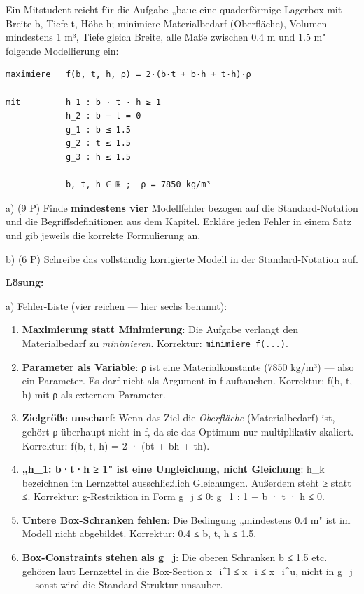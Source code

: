 \documentclass[11pt, a4paper]{article}
\begin{document}
Ein Mitstudent reicht für die Aufgabe „baue eine quaderförmige Lagerbox mit Breite b, Tiefe t, Höhe h; minimiere Materialbedarf (Oberfläche), Volumen mindestens 1 m³, Tiefe gleich Breite, alle Maße zwischen 0.4 m und 1.5 m" folgende Modellierung ein:


\begin{lstlisting}
maximiere   f(b, t, h, ρ) = 2·(b·t + b·h + t·h)·ρ

mit         h_1 : b · t · h ≥ 1
            h_2 : b − t = 0
            g_1 : b ≤ 1.5
            g_2 : t ≤ 1.5
            g_3 : h ≤ 1.5

            b, t, h ∈ ℝ ;  ρ = 7850 kg/m³
\end{lstlisting}


a) (9 P) Finde \textbf{mindestens vier} Modellfehler bezogen auf die Standard-Notation und die Begriffsdefinitionen aus dem Kapitel. Erkläre jeden Fehler in einem Satz und gib jeweils die korrekte Formulierung an.


b) (6 P) Schreibe das vollständig korrigierte Modell in der Standard-Notation auf.


\textbf{Lösung:}


a) Fehler-Liste (vier reichen — hier sechs benannt):


\begin{enumerate}
  \item \textbf{Maximierung statt Minimierung}: Die Aufgabe verlangt den Materialbedarf zu \textit{minimieren}. Korrektur: \texttt{minimiere f(...)}.
  \item \textbf{Parameter als Variable}: ρ ist eine Materialkonstante (7850 kg/m³) — also ein Parameter. Es darf nicht als Argument in f auftauchen. Korrektur: f(b, t, h) mit ρ als externem Parameter.
  \item \textbf{Zielgröße unscharf}: Wenn das Ziel die \textit{Oberfläche} (Materialbedarf) ist, gehört ρ überhaupt nicht in f, da sie das Optimum nur multiplikativ skaliert. Korrektur: f(b, t, h) = 2 · (bt + bh + th).
  \item \textbf{„h\_1: b·t·h ≥ 1" ist eine Ungleichung, nicht Gleichung}: h\_k bezeichnen im Lernzettel ausschließlich Gleichungen. Außerdem steht ≥ statt ≤. Korrektur: g-Restriktion in Form g\_j ≤ 0:  g\_1 : 1 − b · t · h ≤ 0.
  \item \textbf{Untere Box-Schranken fehlen}: Die Bedingung „mindestens 0.4 m" ist im Modell nicht abgebildet. Korrektur: 0.4 ≤ b, t, h ≤ 1.5.
  \item \textbf{Box-Constraints stehen als g\_j}: Die oberen Schranken b ≤ 1.5 etc. gehören laut Lernzettel in die Box-Section x\_i\textasciicircum{}l ≤ x\_i ≤ x\_i\textasciicircum{}u, nicht in g\_j — sonst wird die Standard-Struktur unsauber.
\end{enumerate}
\end{document}
